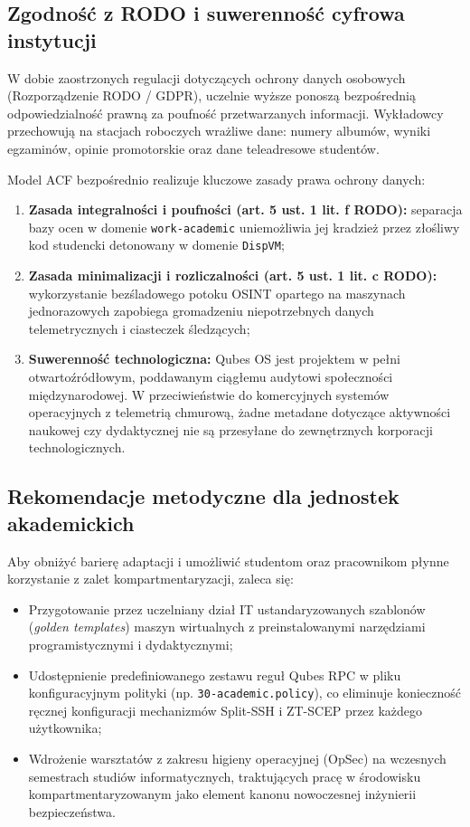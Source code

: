 \subsection{Zgodność z RODO i suwerenność cyfrowa instytucji}
W dobie zaostrzonych regulacji dotyczących ochrony danych osobowych (Rozporządzenie RODO / GDPR), uczelnie wyższe ponoszą bezpośrednią odpowiedzialność prawną za poufność przetwarzanych informacji. Wykładowcy przechowują na stacjach roboczych wrażliwe dane: numery albumów, wyniki egzaminów, opinie promotorskie oraz dane teleadresowe studentów.

Model ACF bezpośrednio realizuje kluczowe zasady prawa ochrony danych:
\begin{enumerate}
    \item \textbf{Zasada integralności i poufności (art. 5 ust. 1 lit. f RODO):} separacja bazy ocen w domenie \texttt{work-academic} uniemożliwia jej kradzież przez złośliwy kod studencki detonowany w domenie \texttt{DispVM};
    \item \textbf{Zasada minimalizacji i rozliczalności (art. 5 ust. 1 lit. c RODO):} wykorzystanie bezśladowego potoku OSINT opartego na maszynach jednorazowych zapobiega gromadzeniu niepotrzebnych danych telemetrycznych i ciasteczek śledzących;
    \item \textbf{Suwerenność technologiczna:} Qubes OS jest projektem w pełni otwartoźródłowym, poddawanym ciągłemu audytowi społeczności międzynarodowej. W przeciwieństwie do komercyjnych systemów operacyjnych z telemetrią chmurową, żadne metadane dotyczące aktywności naukowej czy dydaktycznej nie są przesyłane do zewnętrznych korporacji technologicznych.
\end{enumerate}

\subsection{Rekomendacje metodyczne dla jednostek akademickich}
Aby obniżyć barierę adaptacji i umożliwić studentom oraz pracownikom płynne korzystanie z zalet kompartmentaryzacji, zaleca się:
\begin{itemize}
    \item Przygotowanie przez uczelniany dział IT ustandaryzowanych szablonów (\textit{golden templates}) maszyn wirtualnych z preinstalowanymi narzędziami programistycznymi i dydaktycznymi;
    \item Udostępnienie predefiniowanego zestawu reguł Qubes RPC w pliku konfiguracyjnym polityki (np. \texttt{30-academic.policy}), co eliminuje konieczność ręcznej konfiguracji mechanizmów Split-SSH i ZT-SCEP przez każdego użytkownika;
    \item Wdrożenie warsztatów z zakresu higieny operacyjnej (OpSec) na wczesnych semestrach studiów informatycznych, traktujących pracę w środowisku kompartmentaryzowanym jako element kanonu nowoczesnej inżynierii bezpieczeństwa.
\end{itemize}
